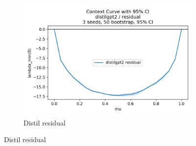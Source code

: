 \documentclass[11pt]{article}
\newcommand{\1}{\mathbf{1}}
\begin{document}
\begin{figure}[t]
\begin{subfigure}[t]{0.32\textwidth}
\includegraphics[width=\linewidth]{figs/curve_distilgpt2_residual.png}
\caption{Distil residual}
\end{subfigure}

\vspace{0.5em}


\end{figure}
\end{document}
